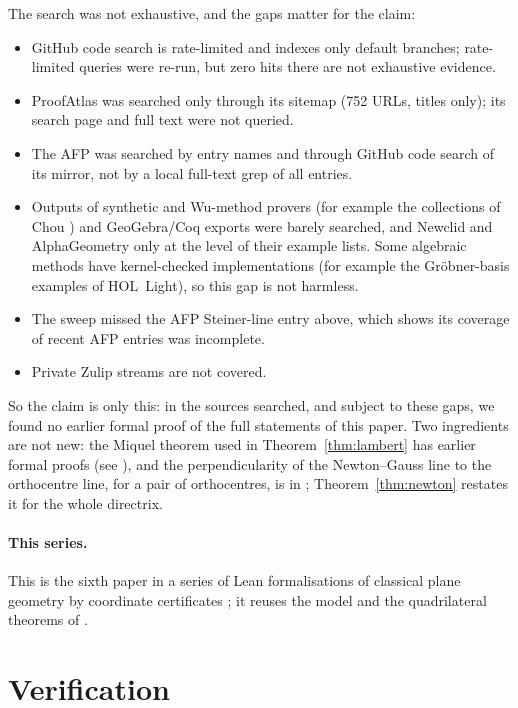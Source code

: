 \documentclass[11pt]{article}
\theoremstyle{definition}
\theoremstyle{remark}
\begin{document}
The search was not exhaustive, and the gaps matter for the claim:
\begin{itemize}
\item GitHub code search is rate-limited and indexes only default branches; rate-limited queries were
re-run, but zero hits there are not exhaustive evidence.
\item ProofAtlas was searched only through its sitemap (752 URLs, titles only); its search page and
full text were not queried.
\item The AFP was searched by entry names and through GitHub code search of its mirror, not by a local
full-text grep of all entries.
\item Outputs of synthetic and Wu-method provers (for example the collections of Chou \cite{chou1988})
and GeoGebra/Coq exports were barely searched, and Newclid and AlphaGeometry only at the level of
their example lists. Some algebraic methods have kernel-checked implementations (for example the
Gr\"obner-basis examples of HOL~Light), so this gap is not harmless.
\item The sweep missed the AFP Steiner-line entry above, which shows its coverage of recent AFP entries
was incomplete.
\item Private Zulip streams are not covered.
\end{itemize}
So the claim is only this: in the sources searched, and subject to these gaps, we found no earlier
formal proof of the full statements of this paper. Two
ingredients are not new: the Miquel theorem used in Theorem~\ref{thm:lambert} has earlier formal proofs
(see \cite{paperE}), and the perpendicularity of the Newton--Gauss line to the orthocentre line, for a
pair of orthocentres, is in \cite{paperE}; Theorem~\ref{thm:newton} restates it for the whole directrix.

\paragraph{This series.} This is the sixth paper in a series of Lean formalisations of classical plane
geometry by coordinate certificates \cite{paperA,paperB,paperC,paperD,paperE}; it reuses the model and
the quadrilateral theorems of \cite{paperE}.

\section{Verification}\label{sec:verify}
\end{document}
